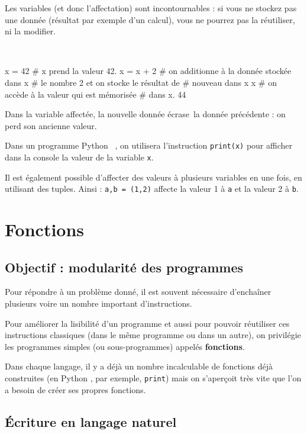 Les variables (et donc l'affectation) sont incontournables : si vous ne stockez pas une donnée 
(résultat par exemple d'un calcul), vous ne pourrez pas la réutiliser, ni la modifier.



\begin{exemple}~
\begin{pyconsole}
x = 42	# x prend la valeur 42.
x = x + 2	# on additionne à la donnée stockée dans x  
		# le nombre 2 et on stocke le résultat de 
		# nouveau dans x
x 		# on accède à la valeur qui est mémorisée 
		# dans x.
 44
\end{pyconsole}
\end{exemple}

Dans la variable affectée, la nouvelle donnée \og écrase\fg\ la donnée précédente : on perd son 
ancienne valeur.

Dans un programme Python \ , on utilisera l'instruction \texttt{print(x)}
pour afficher dans la console la valeur de la variable \texttt{x}.

Il est également possible d'affecter des valeurs à plusieurs variables en une fois, en utilisant 
des tuples. Ainsi : \texttt{a,b = (1,2)} affecte la valeur 1 à \texttt{a} et la valeur 2 à 
\texttt{b}.




\section{Fonctions}
\subsection{Objectif : modularité des programmes}

Pour répondre à un problème donné, il est souvent nécessaire d'enchaîner plusieurs voire un nombre 
important d'instructions.

Pour améliorer la lisibilité d'un programme et aussi pour pouvoir réutiliser 
ces instructions classiques (dans le même programme ou dans un autre),
on privilégie les programmes simples (ou sous-programmes) appelés \textbf{fonctions}.

Dans chaque langage, il y a déjà un nombre incalculable de fonctions déjà construites (en Python , 
par exemple, \texttt{print}) mais on s'aperçoit très vite que l'on a besoin de créer ses propres 
fonctions.


\subsection{\'Ecriture en langage naturel}

